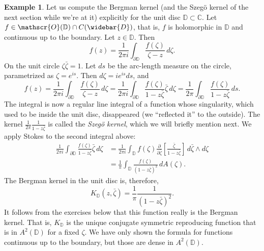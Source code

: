 \documentclass[12pt,openany]{book}
\newcommand{\C}{{\mathbb{C}}}
\newcommand{\D}{{\mathbb{D}}}
\newcommand{\sO}{{\mathscr{O}}}
\theoremstyle{plain}
\theoremstyle{remark}
\theoremstyle{definition}
\theoremstyle{exercise}
\theoremstyle{example}
\newtheorem{example}[thm]{Example}
\begin{document}
\begin{example} \label{example:bergmankerneldisc}
%
%
Let us compute the Bergman kernel (and
the Szeg{\"o} kernel of the next section while we're at it)
explicitly for the
unit disc $\D \subset \C$.  Let $f \in \sO(\D) \cap C(\widebar{D})$, that
is, $f$ is holomorphic in $\D$ and continuous up to the boundary.
Let $z \in \D$.
Then
\begin{equation*}
f(z) = \frac{1}{2\pi i} \int_{\partial \D} \frac{f(\zeta)}{\zeta-z} \,
d\zeta .
\end{equation*}
On the unit circle $\zeta \bar{\zeta} = 1$.  Let $ds$ be
the arc-length measure on the circle, parametrized as $\zeta =
e^{is}$.
Then $d\zeta = i e^{is} ds$, and
\begin{equation*}
f(z) = \frac{1}{2\pi i} \int_{\partial \D} \frac{f(\zeta)}{\zeta-z} \,
d\zeta
= \frac{1}{2\pi i} \int_{\partial \D} \frac{f(\zeta)}{1-z\bar{\zeta}}
\bar{\zeta} \, d\zeta
= \frac{1}{2\pi} \int_{\partial \D} \frac{f(\zeta)}{1-z\bar{\zeta}} \, ds .
\end{equation*}
The integral is now a regular line integral of a function whose
singularity, which used to be inside the unit disc, disappeared
(we ``reflected it'' to the outside).
The kernel $\frac{1}{2\pi} \frac{1}{1-z\bar{\zeta}}$ is called the
\emph{Szeg{\"o} kernel}, which we will briefly mention next.
We apply Stokes to the second integral above:
\begin{equation*}
\begin{split}
\frac{1}{2\pi i} \int_{\partial \D} \frac{f(\zeta)}{1-z\bar{\zeta}}
\bar{\zeta} \, d\zeta
&=
\frac{1}{2\pi i} \int_{\D} f(\zeta)
\frac{\partial}{\partial \bar{\zeta}} \left[
\frac{\bar{\zeta}}{1-z\bar{\zeta}} \right] \,
d\bar{\zeta} \wedge d\zeta
\\
&=
\frac{1}{\pi} \int_{\D}
\frac{f(\zeta)}{{(1-z\bar{\zeta})}^2} \, dA(\zeta) .
\end{split}
\end{equation*}
The Bergman kernel in the unit disc is, therefore,
\begin{equation*}
K_{\D}(z,\bar{\zeta}) = \frac{1}{\pi} \frac{1}{{(1-z\bar{\zeta})}^2} .
\end{equation*}
It follows from the exercises below that
this function really is the Bergman kernel.
That is, $K_{\D}$ is the unique conjugate symmetric
reproducing function that is in
$A^2({\D})$ for a fixed $\zeta$.
We have only shown the formula for functions continuous up to the boundary,
but those are dense in $A^2({\D})$.
\end{example}
\end{document}
